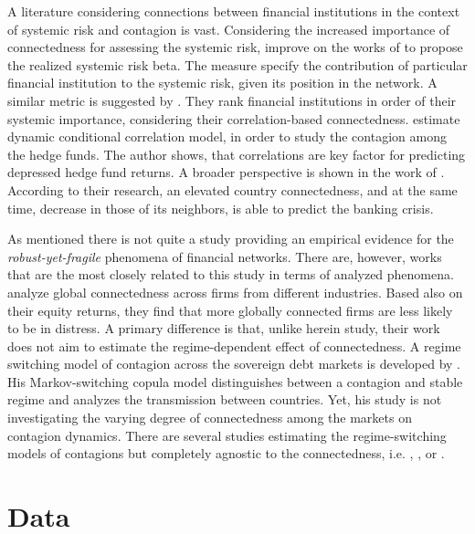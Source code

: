 \documentclass[12pt]{article}
\begin{document}
A literature considering connections between financial institutions in the context of systemic risk and contagion is vast. Considering the increased importance of connectedness for assessing the systemic risk, \cite{hautsch14} improve on the works of \cite{adrian16} to propose the realized systemic risk beta. The measure specify the contribution of particular financial institution to the systemic risk, given its position in the network. A similar metric is suggested by \cite{dungey12}. They rank financial institutions in order of their systemic importance, considering their correlation-based connectedness. \cite{savona14} estimate dynamic conditional correlation model, in order to study the contagion among the hedge funds. The author shows, that correlations are key factor for predicting depressed hedge fund returns. A broader perspective is shown in the work of \cite{minoiu15}. According to their research, an elevated country connectedness, and at the same time, decrease in those of its neighbors, is able to predict the banking crisis.

As mentioned there is not quite a study providing an empirical evidence for the \textit{robust-yet-fragile} phenomena of financial networks. There are, however, works that are the most closely related to this study in terms of analyzed phenomena. \cite{everett21} analyze global connectedness across firms from different industries. Based also on their equity returns, they find that more globally connected firms are less likely to be in distress. A primary difference is that, unlike herein study, their work does not aim to estimate the regime-dependent effect of connectedness. A regime switching model of contagion across the sovereign debt markets is developed by \cite{saida18}. His Markov-switching copula model distinguishes between a contagion and stable regime and analyzes the transmission between countries. Yet, his study is not investigating the varying degree of connectedness among the markets on contagion dynamics.
There are several studies estimating the regime-switching models of contagions but completely agnostic to the connectedness, i.e. \cite{lopes12}, \cite{savona15}, \cite{guo11} or \cite{chan19}.


\section{Data}\label{section:Data}
\end{document}
